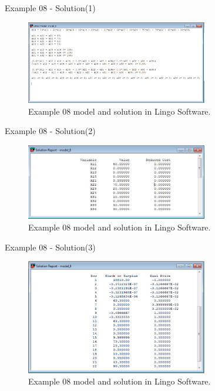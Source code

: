 \begin{frame}{Example 08 - Solution(1)}
\begin{figure}
    \includegraphics[width=300px]{slides/ex08/screenshot_a.png}
    \caption{Example 08 model and solution in Lingo Software.}
\end{figure}
\end{frame}

\begin{frame}{Example 08 - Solution(2)}
\begin{figure}
    \includegraphics[width=300px]{slides/ex08/screenshot_b.png}
    \caption{Example 08 model and solution in Lingo Software.}
\end{figure}
\end{frame}


\begin{frame}{Example 08 - Solution(3)}
\begin{figure}
    \includegraphics[width=300px]{slides/ex08/screenshot_c.png}
    \caption{Example 08 model and solution in Lingo Software.}
\end{figure}
\end{frame}

